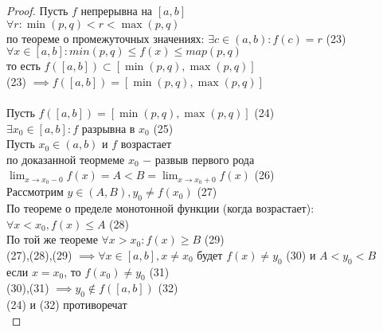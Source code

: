 \begin{proof}
    
    Пусть $f$ непрерывна на  $[a,b]$\\
		 $\forall r: \min (p,q) < r < \max (p,q)$\\
		 по теореме о промежуточных значениях: $\exists c \in (a,b): f(c) = r$ (23)\\
		 $\forall x \in [a,b]: min(p,q) \le f(x) \le map(p,q)$\\
		 то есть $f([a,b]) \subset [\min (p,q), \max (p,q)]$\\
		 (23) $\implies f([a,b]) = [\min (p,q), \max (p,q)]$\\
		 \\
		 Пусть $f([a,b]) = [\min (p,q), \max (p,q)]$ (24)\\
		 $\exists x_0 \in [a,b]: f\text{ разрывна в }x_0$ (25)\\
		 Пусть $x_0 \in (a,b)$ и $f$ возрастает\\
		 по доказанной теормеме $x_0$ $-$ развыв первого рода\\
		 $\displaystyle\lim_{x \to x_0-0} f(x) = A < B = \displaystyle\lim_{x \to x_0+0} f(x)$ (26)\\
		 Рассмотрим $y \in (A, B), y_0 \neq f(x_0)$ (27)\\
		 По теореме о пределе монотонной функции (когда возрастает): $\forall x < x_0, f(x) \le A$ (28)\\
		 По той же теореме $\forall x  > x_0: f(x) \ge B$ (29)\\
		 (27),(28),(29) $\implies \forall x \in [a,b], x \neq x_0$ будет $f(x) \neq y_0$ (30) и $A < y_0 < B$ \\
		 если $x = x_0$, то $f(x_0) \neq y_0$ (31)\\
		 (30),(31) $\implies y_0 \not\in f([a,b])$ (32)\\
		 (24) и (32) противоречат \\
\end{proof}
